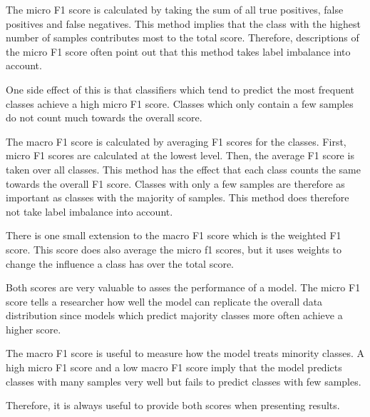 The micro F1 score is calculated by taking the sum of all true positives, false positives and false negatives. This method implies that the class with the highest number of samples contributes most to the total score. Therefore, descriptions of the micro F1 score often point out that this method takes label imbalance into account. 

One side effect of this is that classifiers which tend to predict the most frequent classes achieve a high micro F1 score. Classes which only contain a few samples do not count much towards the overall score.
\bigskip

The macro F1 score is calculated by averaging F1 scores for the classes. First, micro F1 scores are calculated at the lowest level. Then, the average F1 score is taken over all classes. This method has the effect that each class counts the same towards the overall F1 score. Classes with only a few samples are therefore as important as classes with the majority of samples. This method does therefore not take label imbalance into account.
\medskip

There is one small extension to the macro F1 score which is the weighted F1 score. This score does also average the micro f1 scores, but it uses weights to change the influence a class has over the total score.
\bigskip

Both scores are very valuable to asses the performance of a model. The micro F1 score tells a researcher how well the model can replicate the overall data distribution since models which predict majority classes more often achieve a higher score. 
\medskip

The macro F1 score is useful to measure how the model treats minority classes. A high micro F1 score and a low macro F1 score imply that the model predicts classes with many samples very well but fails to predict classes with few samples.

Therefore, it is always useful to provide both scores when presenting results.